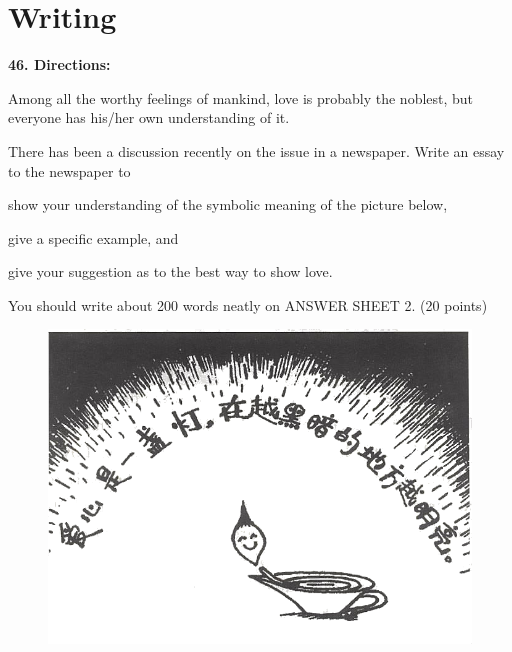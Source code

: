 \section{Writing}


\noindent
\textbf{46. Directions:}

Among all the worthy feelings of mankind, love is probably the noblest,
but everyone has his/her own understanding of it.

There has been a discussion recently on the issue in a newspaper. Write
an essay to the newspaper to
\begin{listwrite}
	\item 
show your understanding of the symbolic meaning of the picture below,

\item 
give a specific example, and

\item 
give your suggestion as to the best way to show love.

\end{listwrite}

You should write about 200 words neatly on ANSWER SHEET 2. (20 points)

\begin{figure}[h!]
	\centering
	\includegraphics[width=0.5\linewidth]{picture/2001.png}
\end{figure}



\checkpagenumber